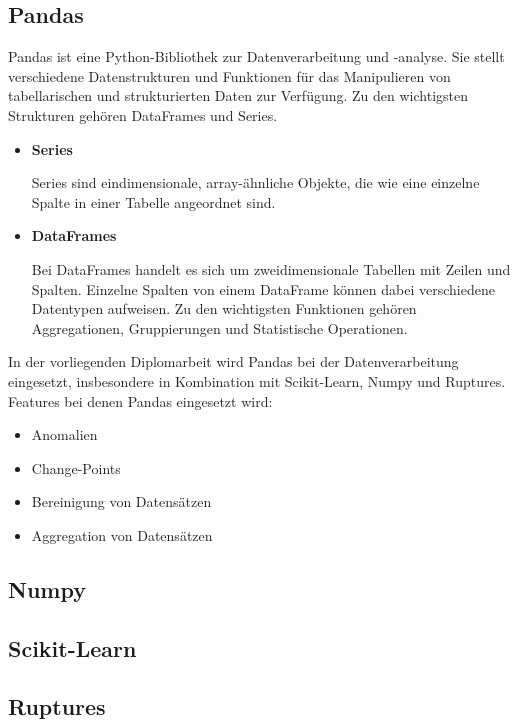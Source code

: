 \documentclass{report}
\begin{document}
\subsection{Pandas}
Pandas ist eine Python-Bibliothek zur Datenverarbeitung und -analyse. Sie stellt verschiedene Datenstrukturen und Funktionen für das Manipulieren von tabellarischen und strukturierten Daten zur Verfügung. Zu den wichtigsten Strukturen gehören DataFrames und Series.
\begin{itemize}
    \item \textbf{Series} \\
    \begin{minipage}[t]{\linewidth}
        Series sind eindimensionale, array-ähnliche Objekte, die wie eine einzelne Spalte in einer Tabelle angeordnet sind.
    \end{minipage}

    \item \textbf{DataFrames} \\
    \begin{minipage}[t]{\linewidth}
        Bei DataFrames handelt es sich um zweidimensionale Tabellen mit Zeilen und Spalten. Einzelne Spalten von einem DataFrame können dabei verschiedene Datentypen aufweisen. Zu den wichtigsten Funktionen gehören Aggregationen, Gruppierungen und Statistische Operationen. 
    \end{minipage}
\end{itemize}
  In der vorliegenden Diplomarbeit wird Pandas bei der Datenverarbeitung eingesetzt, insbesondere in Kombination mit Scikit-Learn, Numpy und Ruptures.
  Features bei denen Pandas eingesetzt wird:
  \begin{itemize}
      \item Anomalien
      \item Change-Points
      \item Bereinigung von Datensätzen
      \item Aggregation von Datensätzen
  \end{itemize}

\subsection{Numpy}
\subsection{Scikit-Learn}
\subsection{Ruptures}
\end{document}
